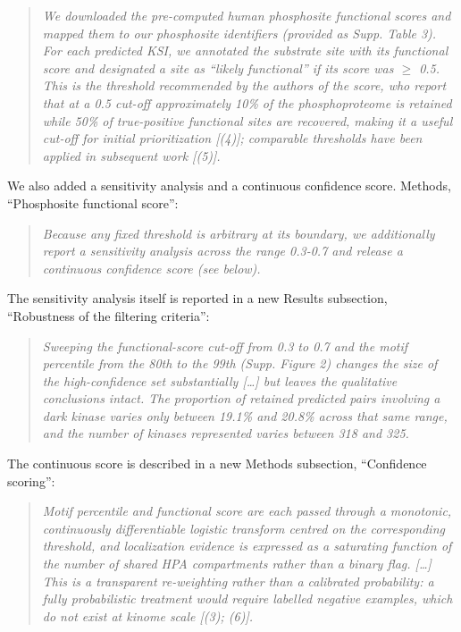 \documentclass[
]{article}
\begin{document}
\begin{quote}
\emph{We downloaded the pre-computed human phosphosite functional scores
and mapped them to our phosphosite identifiers (provided as Supp. Table
3). For each predicted KSI, we annotated the substrate site with its
functional score and designated a site as ``likely functional'' if its
score was \(\ge\) 0.5. This is the threshold recommended by the authors
of the score, who report that at a 0.5 cut-off approximately 10\% of the
phosphoproteome is retained while 50\% of true-positive functional sites
are recovered, making it a useful cut-off for initial prioritization
{[}(4){]}; comparable thresholds have been applied in subsequent work
{[}(5){]}.}
\end{quote}

We also added a sensitivity analysis and a continuous confidence score.
Methods, ``Phosphosite functional score'':

\begin{quote}
\emph{Because any fixed threshold is arbitrary at its boundary, we
additionally report a sensitivity analysis across the range 0.3-0.7 and
release a continuous confidence score (see below).}
\end{quote}

The sensitivity analysis itself is reported in a new Results subsection,
``Robustness of the filtering criteria'':

\begin{quote}
\emph{Sweeping the functional-score cut-off from 0.3 to 0.7 and the
motif percentile from the 80th to the 99th (Supp. Figure 2) changes the
size of the high-confidence set substantially {[}\ldots{]} but leaves
the qualitative conclusions intact. The proportion of retained predicted
pairs involving a dark kinase varies only between 19.1\% and 20.8\%
across that same range, and the number of kinases represented varies
between 318 and 325.}
\end{quote}

The continuous score is described in a new Methods subsection,
``Confidence scoring'':

\begin{quote}
\emph{Motif percentile and functional score are each passed through a
monotonic, continuously differentiable logistic transform centred on the
corresponding threshold, and localization evidence is expressed as a
saturating function of the number of shared HPA compartments rather than
a binary flag. {[}\ldots{]} This is a transparent re-weighting rather
than a calibrated probability: a fully probabilistic treatment would
require labelled negative examples, which do not exist at kinome scale
{[}(3); (6){]}.}
\end{quote}
\end{document}
